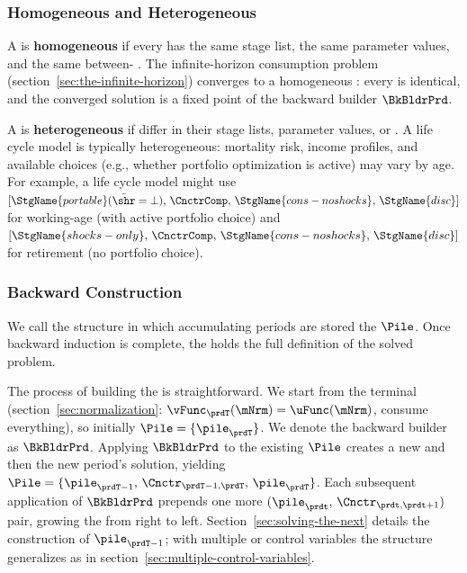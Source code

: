 \documentclass[SolvingMicroDSOPs]{subfiles}
\begin{document}
\subsubsection{Homogeneous and Heterogeneous {\PilesName}}

A {\pileName} is \textbf{homogeneous} if every {\interval} has the same
stage list, the same parameter values, and the same between-{\interval}
{\Cnct}. The infinite-horizon consumption problem
(section~\ref{sec:the-infinite-horizon}) converges to a homogeneous
{\pileName}: every {\interval} is identical, and the converged solution
is a fixed point of the backward builder $\BkBldrPrd$.

A {\pileName} is \textbf{heterogeneous} if {\intervals} differ in their
stage lists, parameter values, or {\Cncts}. A life cycle model is
typically heterogeneous: mortality risk, income profiles, and available
choices (e.g., whether portfolio optimization is active) may vary by age.
For example, a life cycle model might use
$[\StgName{portable}(\bar{\shr}=\bot),\, \CnctrComp,\,
  \StgName{cons-noshocks},\, \StgName{disc}]$
for working-age {\intervals} (with active portfolio choice) and
$[\StgName{shocks-only},\, \CnctrComp,\,
  \StgName{cons-noshocks},\, \StgName{disc}]$
for retirement {\intervals} (no portfolio choice).

\subsubsection{Backward Construction}

We call the structure in which accumulating periods are stored the
{\pileName} $\Pile$. Once backward induction is complete, the {\pileName}
holds the full definition of the solved problem.

The process of building the {\pileName} is straightforward. We start from
the terminal {\interval} (section~\ref{sec:normalization}:
$\vFunc_{\prdT}(\mNrm) = \uFunc(\mNrm)$, consume everything), so initially
$\Pile = \{\pile_{\prdT}\}$. We denote the backward builder as $\BkBldrPrd$.
Applying $\BkBldrPrd$ to the existing $\Pile$ creates a new {\Cnct} and
then the new period's solution, yielding
$\Pile = \{\pile_{\prdT-1},\, \Cnctr_{\prdT-1,\prdT},\, \pile_{\prdT}\}$.
Each subsequent application of $\BkBldrPrd$ prepends one more
$(\pile_{\prdt},\, \Cnctr_{\prdt,\prdt+1})$ pair, growing the {\pileName}
from right to left. Section~\ref{sec:solving-the-next} details the
construction of $\pile_{\prdT-1}$; with multiple {\stgs} or control
variables the structure generalizes as in
section~\ref{sec:multiple-control-variables}.
\end{document}
